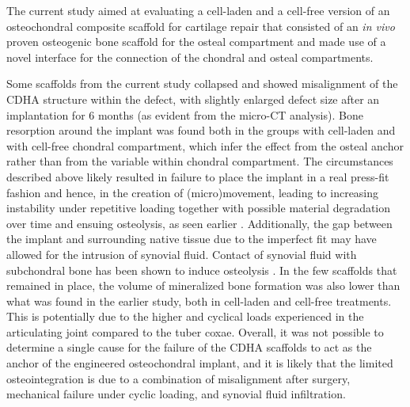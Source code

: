 \documentclass[twocolumn, empirical, authordate, issue]{jote-new-article}
\begin{document}
\begin{originalPurpose}
The current study aimed at evaluating a cell-laden and a cell-free version of an osteochondral composite scaffold for cartilage repair that consisted of an \emph{in vivo} proven osteogenic bone scaffold for the osteal compartment and made use of a novel interface for the connection of the chondral and osteal compartments.
\end{originalPurpose}

Some scaffolds from the current study collapsed and showed misalignment of the CDHA structure within the defect, with slightly enlarged defect size after an implantation for 6 months (as evident from the micro-CT analysis). Bone resorption around the implant was found both in the groups with cell-laden and with cell-free chondral compartment, which infer the effect from the osteal anchor rather than from the variable within chondral compartment. The circumstances described above likely resulted in failure to place the implant in a real press-fit fashion and hence, in the creation of (micro)movement, leading to increasing instability under repetitive loading together with possible material degradation over time and ensuing osteolysis, as seen earlier \parencite{Albrektsson2019, Goodman2019}. Additionally, the gap between the implant and surrounding native tissue due to the imperfect fit may have allowed for the intrusion of synovial fluid. Contact of synovial fluid with subchondral bone has been shown to induce osteolysis \parencite{Kold1986}. In the few scaffolds that remained in place, the volume of mineralized bone formation was also lower than what was found in the earlier study, both in cell-laden and cell-free treatments. This is potentially due to the higher and cyclical loads experienced in the articulating joint compared to the tuber coxae. Overall, it was not possible to determine a single cause for the failure of the CDHA scaffolds to act as the anchor of the engineered osteochondral implant, and it is likely that the limited osteointegration is due to a combination of misalignment after surgery, mechanical failure under cyclic loading, and synovial fluid infiltration.
\end{document}
